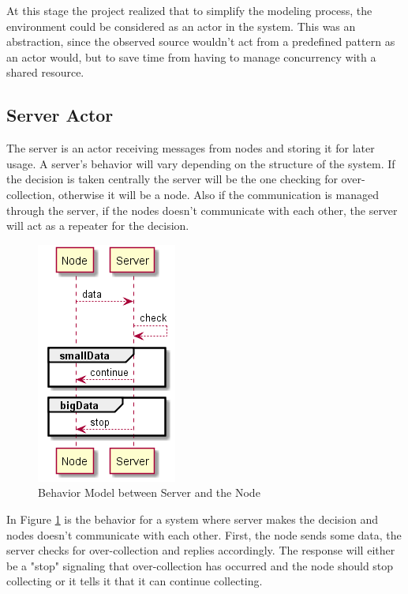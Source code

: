 At this stage the project realized that to simplify the modeling process, the environment could be considered as an actor in the system. This was an abstraction, since the observed source wouldn't act from a predefined pattern as an actor would, but to save time from having to manage concurrency with a shared resource.




\subsection{Server Actor}

The server is an actor receiving messages from nodes and storing it for later usage. A server's behavior will vary depending on the structure of the system. If the decision is taken centrally the server will be the one checking for over-collection, otherwise it will be a node. Also if the communication is managed through the server, if the nodes doesn't communicate with each other, the server will act as a repeater for the decision. 

\begin{figure}[ht]
    \includegraphics{include/figures/server_behav}
    \caption{Behavior Model between Server and the Node}
    \label{fig:node_server_behav}
\end{figure}

In Figure \ref{fig:node_server_behav} is the behavior for a system where server makes the decision and nodes doesn't communicate with each other. First, the node sends some data, the server checks for over-collection and replies accordingly. The response will either be a "stop" signaling that over-collection has occurred and the node should stop collecting or it tells it that it can continue collecting. 

